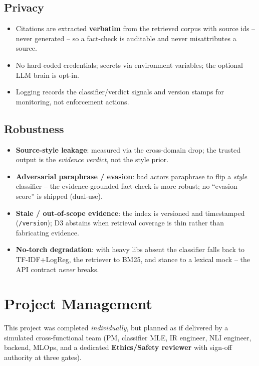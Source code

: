 \documentclass[12pt,a4paper]{article}
\begin{document}
\subsection{Privacy}

\begin{itemize}
  \item Citations are extracted \textbf{verbatim} from the retrieved corpus with source ids -- never generated -- so a fact-check is auditable and never misattributes a source.
  \item No hard-coded credentials; secrets via environment variables; the optional LLM brain is opt-in.
  \item Logging records the classifier/verdict signals and version stamps for monitoring, not enforcement actions.
\end{itemize}

\subsection{Robustness}

\begin{itemize}\setlength\itemsep{0.15em}
  \item \textbf{Source-style leakage}: measured via the cross-domain drop; the trusted output is the \emph{evidence verdict}, not the style prior.
  \item \textbf{Adversarial paraphrase / evasion}: bad actors paraphrase to flip a \emph{style} classifier -- the evidence-grounded fact-check is more robust; no ``evasion score'' is shipped (dual-use).
  \item \textbf{Stale / out-of-scope evidence}: the index is versioned and timestamped (\texttt{/version}); D3 abstains when retrieval coverage is thin rather than fabricating evidence.
  \item \textbf{No-torch degradation}: with heavy libs absent the classifier falls back to TF-IDF+LogReg, the retriever to BM25, and stance to a lexical mock -- the API contract \emph{never} breaks.
\end{itemize}

\section{Project Management}

This project was completed \emph{individually}, but planned as if delivered by a simulated cross-functional team (PM, classifier MLE, IR engineer, NLI engineer, backend, MLOps, and a dedicated \textbf{Ethics/Safety reviewer} with sign-off authority at three gates).
\end{document}
